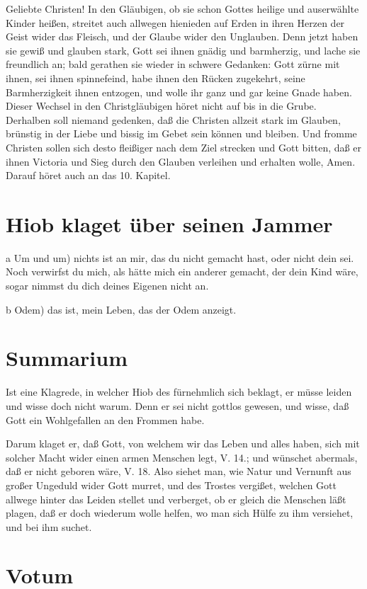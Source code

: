 Geliebte Christen! In den Gläubigen, ob sie schon Gottes heilige und auserwählte Kinder heißen, streitet auch allwegen hienieden auf Erden in ihren Herzen der Geist wider das Fleisch, und der Glaube wider den Unglauben. Denn jetzt haben sie gewiß und glauben stark, Gott sei ihnen gnädig und barmherzig, und lache sie freundlich an; bald gerathen sie wieder in schwere Gedanken: Gott zürne mit ihnen, sei ihnen spinnefeind, habe ihnen den Rücken zugekehrt, seine Barmherzigkeit ihnen entzogen, und wolle ihr ganz und gar keine Gnade haben. Dieser Wechsel in den Christgläubigen höret nicht auf bis in die Grube. Derhalben soll niemand gedenken, daß die Christen allzeit stark im Glauben, brünstig in der Liebe und bissig im Gebet sein können und bleiben. Und fromme Christen sollen sich desto fleißiger nach dem Ziel strecken und Gott bitten, daß er ihnen Victoria und Sieg durch den Glauben verleihen und erhalten wolle, Amen. Darauf höret auch an das 10. Kapitel.

\section{Hiob klaget über seinen Jammer}

a Um und um) nichts ist an mir, das du nicht gemacht hast, oder nicht dein sei. Noch verwirfst du mich, als hätte mich ein anderer gemacht, der dein Kind wäre, sogar nimmst du dich deines Eigenen nicht an.

b Odem) das ist, mein Leben, das der Odem anzeigt.

\section{Summarium}

Ist eine Klagrede, in welcher Hiob des fürnehmlich sich beklagt, er müsse leiden und wisse doch nicht warum. Denn er sei nicht gottlos gewesen, und wisse, daß Gott ein Wohlgefallen an den Frommen habe.

Darum klaget er, daß Gott, von welchem wir das Leben und alles haben, sich mit solcher Macht wider einen armen Menschen legt, V. 14.; und wünschet abermals, daß er nicht geboren wäre, V. 18. Also siehet man, wie Natur und Vernunft aus großer Ungeduld wider Gott murret, und des Trostes vergißet, welchen Gott allwege hinter das Leiden stellet und verberget, ob er gleich die Menschen läßt plagen, daß er doch wiederum wolle helfen, wo man sich Hülfe zu ihm versiehet, und bei ihm suchet.

\section{Votum}

